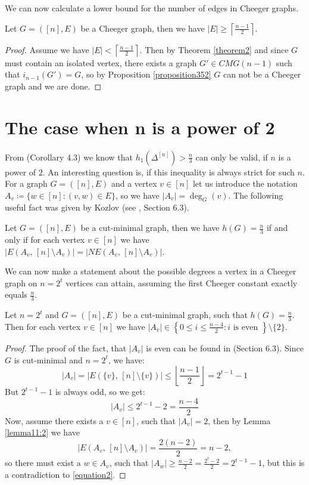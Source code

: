 We can now calculate a lower bound for the number of edges in Cheeger graphs.

\begin{prop}
Let \(G=([n],E)\) be a Cheeger graph, then we have \(|E|\geq\left\lceil\frac{n-1}{2}\right\rceil\).
\begin{proof}
Assume we have \(|E|<\left\lceil\frac{n-1}{2}\right\rceil\). Then by Theorem \ref{theorem2} and since \(G\) must contain an isolated vertex, there exists a graph \(G'\in CMG(n-1)\) such that \(i_{n-1}(G')=G\), so by Proposition \ref{proposition352} \(G\) can not be a Cheeger graph and we are done.
\end{proof}
\end{prop}

\section{The case when n is a power of 2}

From \cite{1} (Corollary 4.3) we know that \(h_1(\Delta^{[n]})>\frac{n}{3}\) can only be valid, if \(n\) is a power of \(2\). An interesting question is, if this inequality is always strict for such \(n\). For a graph \(G=([n],E)\) and a vertex \(v\in [n]\) let us introduce the notation\\
\(A_v\coloneqq \{w\in [n]:(v,w)\in E\}\), so we have \(|A_v|=\deg_G(v)\). The following useful fact was given by Kozlov (see \cite{1}, Section 6.3).

\begin{lem}\label{lemma11:2}
Let \(G=([n],E)\) be a cut-minimal graph, then we have \(h(G)=\frac{n}{3}\) if and only if for each vertex \(v\in [n]\) we have \(|E(A_v\text{, }[n]\setminus A_v)|=|NE(A_v\text{, }[n]\setminus A_v)|\).
\end{lem}

We can now make a statement about the possible degrees a vertex in a Cheeger graph on \(n=2^t\) vertices can attain, assuming the first Cheeger constant exactly equals \(\frac{n}{3}\).

\begin{prop}\label{proposition321}
Let \(n=2^t\) and \(G=([n],E)\) be a cut-minimal graph, such that \(h(G)=\frac{n}{3}\). Then for each vertex \(v\in [n]\) we have \(|A_v|\in\left\{0\leq i\leq\frac{n-4}{2}:i\text{ is even }\right\}\setminus\{2\}\).
\begin{proof}
The proof of the fact, that \(|A_v|\) is even can be found in \cite{1} (Section 6.3). Since \(G\) is cut-minimal and \(n=2^t\), we have:
\[
|A_v|=|E(\{v\}\text{, }[n]\setminus\{v\})|\leq\left\lfloor\frac{n-1}{2}\right\rfloor=2^{t-1}-1
\]
But \(2^{t-1}-1\) is always odd, so we get:
\begin{equation}\label{equation2}
|A_v|\leq 2^{t-1}-2=\frac{n-4}{2}
\end{equation}
Now, assume there exists a \(v\in [n]\), such that \(|A_v|=2\), then by Lemma \ref{lemma11:2} we have
\[
|E(A_v\text{, }[n]\setminus A_v)|=\frac{2(n-2)}{2}=n-2,
\]
so there must exist a \(w\in A_v\), such that \(|A_w|\geq\frac{n-2}{2}=\frac{2^t-2}{2}=2^{t-1}-1\), but this is a contradiction to \ref{equation2}.
\end{proof}
\end{prop}

